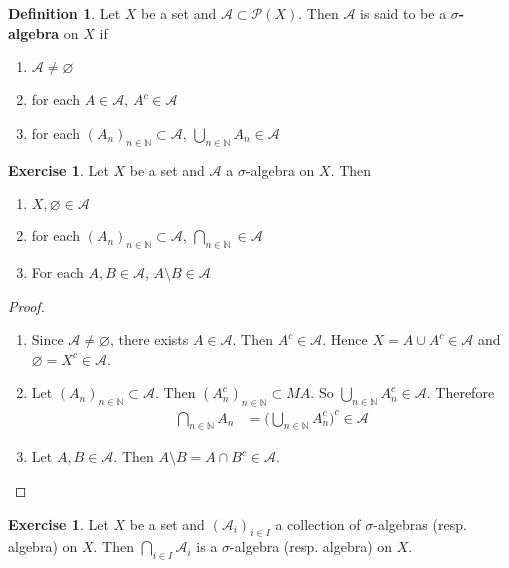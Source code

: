 \documentclass{book}
\theoremstyle{definition}
\newtheorem{defn}[definition]{Definition}
\newtheorem{ex}[definition]{Exercise}
\newcommand{\sig}{\sigma}
\newcommand{\N}{\mathbb{N}}
\newcommand{\MA}{\mathcal{A}}
\newcommand{\MP}{\mathcal{P}}
\newcommand{\lex}[1]{\label{ex:#1}}
\newcommand{\ld}[1]{\label{defn:#1}}
\DeclareMathOperator*{\0}{\mbf{0}}
\DeclareMathOperator*{\1}{\mbf{1}}
\begin{document}
	\begin{defn} \ld{00000} 
		Let $X$ be a set and $\MA \subset \MP(X)$. Then $\MA$ is said to be a $\sigma$\textbf{-algebra} on $X$ if 
		\begin{enumerate}
			\item $\MA \neq \varnothing$
			\item for each $A \in \MA$, $A^c \in \MA$
			\item for each $(A_n)_{n \in \N} \subset \MA$, $\bigcup\limits_{n \in \N}A_n \in \MA$
		\end{enumerate}
	\end{defn}
	
	\begin{ex} \lex{00000} 
		Let $X$ be a set and $\MA$ a $\sig$-algebra on $X$. Then 
		\begin{enumerate}
			\item $X, \varnothing \in \MA$
			\item for each $(A_n)_{n \in \N} \subset \MA$, $\bigcap\limits_{n \in \N} \in \MA$
			\item For each $A, B \in \MA$, $A \setminus B \in \MA$  
		\end{enumerate}
	\end{ex}
	
	\begin{proof}\
		\begin{enumerate}
			\item Since $\MA \neq \varnothing$, there exists $A \in \MA$. Then $A^c \in \MA$. Hence $X = A \cup A^c \in \MA$ and $\varnothing = X^c \in \MA$.
			\item Let $(A_n)_{n \in \N} \subset \MA$. Then $(A_n^c)_{n \in \N} \subset MA$. So $\bigcup\limits_{n \in \N}A_n^c \in \MA$. Therefore \begin{align*}
				\bigcap\limits_{n \in \N}A_n 
				&= \bigg(\bigcup\limits_{n \in \N}A_n^c\bigg)^c \in \MA
			\end{align*}
			\item Let $A,B \in \MA$. Then $A \setminus B = A \cap B^c \in \MA$. 
		\end{enumerate}
	\end{proof}
	
	\begin{ex} \lex{00000} 
		Let $X$ be a set and $(\MA_i)_{i \in I}$ a collection of $\sig$-algebras (resp. algebra) on $X$. Then $\bigcap\limits_{i \in I}\MA_i$ is a $\sig$-algebra (resp. algebra) on $X$.
	\end{ex}
	
\end{document}
